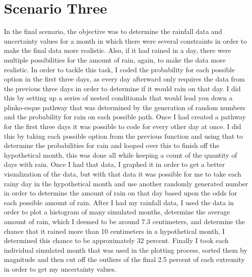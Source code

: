 \documentclass[twocolumn]{revtex4}
\begin{document}
\section{Scenario Three}
In the final scenario, the objective was to determine the rainfall data and uncertainty values for a month in which there were several constraints in order to make the final data more realistic. Also, if it had rained in a day, there were multiple possibilities for the amount of rain, again, to make the data more realistic. In order to tackle this task, I coded the probability for each possible option in the first three days, as every day afterward only requires the data from the previous three days in order to determine if it would rain on that day. I did this by setting up a series of nested conditionals that would lead you down a plinko-esque pathway that was determined by the generation of random numbers and the probability for rain on each possible path. Once I had created a pathway for the first three days it was possible to code for every other day at once. I did this by taking each possible option from the previous function and using that to determine the probabilities for rain and looped over this to finish off the hypothetical month, this was done all while keeping a count of the quantity of days with rain. Once I had that data, I graphed it in order to get a better visualization of the data, but with that data it was possible for me to take each rainy day in the hypothetical month and use another randomly generated number in order to determine the amount of rain on that day based upon the odds for each possible amount of rain. After I had my rainfall data, I used the data in order to plot a histogram of many simulated months, determine the average amount of rain, which I deemed to be around 7.3 centimeters, and determine the chance that it rained more than 10 centimeters in a hypothetical month, I determined this chance to be approximately 32 percent. Finally I took each individual simulated month that was used in the plotting process, sorted them by magnitude and then cut off the outliers of the final 2.5 percent of each extremity in order to get my uncertainty values.
\end{document}
